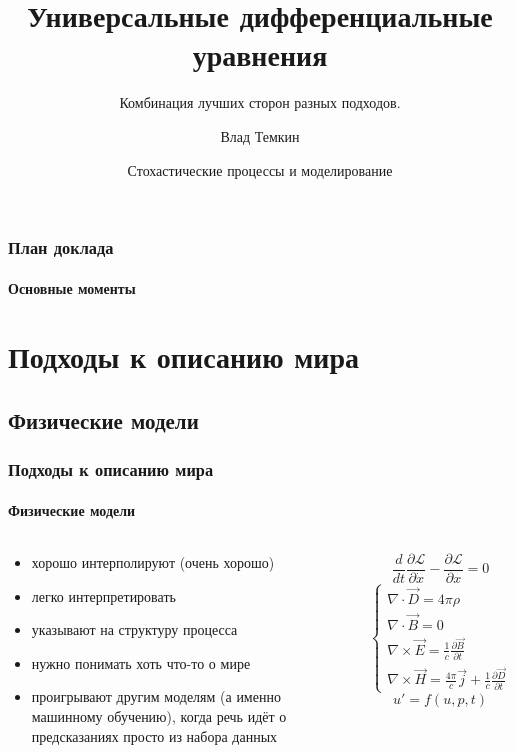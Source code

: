 \documentclass[10pt,pdf,hyperref={unicode}]{beamer}
\title[UDE]{Универсальные дифференциальные уравнения}
\subtitle{Комбинация лучших сторон разных подходов.}
\author{Влад Темкин}
\institute[HSE] %
{
	Высшая Школа Экономики\\
	Факультет Физики
}
\date[\today]
{Стохастические процессы и моделирование}
\begin{document}
	
	\begin{frame}
		\titlepage
	\end{frame} 
	
	
	\begin{frame}
		\frametitle{План доклада} 
		\framesubtitle{Основные моменты}
		\tableofcontents[pausesections]
	\end{frame}


	\section{Подходы к описанию мира}
	
		\subsection{Физические модели}
		
			\begin{frame}
				\frametitle{Подходы к описанию мира} 
				\framesubtitle{Физические модели}
					\begin{columns}
						\column{0.5\linewidth}
						\begin{center}
							\begin{itemize}
								\item<2-> хорошо интерполируют (очень хорошо)
								\item<3-> легко интерпретировать 
								\item<4-> указывают на структуру процесса
								\item<5-> нужно понимать хоть что-то о мире
								\item<6-> проигрывают другим моделям (а именно машинному обучению), когда речь идёт о предсказаниях просто из набора данных
							\end{itemize}
						\end{center}
						\column{0.5\linewidth}
							\begin{displaymath}
								\frac{d}{dt}\frac{\partial \mathcal{L}}{\partial \dot{x}} - \frac{\partial \mathcal{L}}{\partial x} = 0
							\end{displaymath}
							\newline
							\begin{displaymath}
								\left\{\begin{gathered}
									\nabla \cdot \vec{D} = 4\pi	\rho\\
									\nabla \cdot \vec{B} = 0 \\
									\nabla \times \vec{E} = \frac{1}{c}\frac{\partial \vec{B}}{\partial t} \\
									\nabla \times \vec{H} = \frac{4\pi}{c}\vec{j} + \frac{1}{c}\frac{\partial \vec{D}}{\partial t}
								\end{gathered}\right.
							\end{displaymath}
							\newline
							\begin{displaymath}
								u' = f(u,p,t)
							\end{displaymath}
					\end{columns}
			\end{frame}
		
\end{document}

